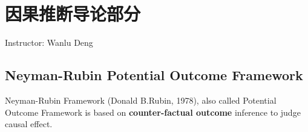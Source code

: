 \chapter{因果推断导论部分}\label{SecCausalInference}
\begin{center}
    Instructor: Wanlu Deng
\end{center}



\section{Neyman-Rubin Potential Outcome Framework}
    Neyman-Rubin Framework (Donald B.Rubin, 1978), also called Potential Outcome Framework is based on \textbf{counter-factual outcome} inference to judge causal effect. 


    
    
        

